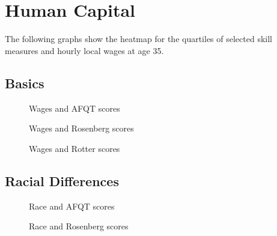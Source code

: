 \FloatBarrier\section{Human Capital}
The following graphs show the heatmap for the quartiles of selected skill measures and hourly local wages at age 35.

\FloatBarrier\subsection{Basics}
\begin{figure}[htp]\centering
\caption{Wages and AFQT scores}
\end{figure}

\begin{figure}[htp]\centering
\caption{Wages and Rosenberg scores}
\end{figure}

\begin{figure}[htp]\centering
\caption{Wages and Rotter scores}
\end{figure}
\FloatBarrier\subsection{Racial Differences}
\begin{figure}[htp]\centering
\caption{Race and AFQT scores}
\end{figure}

\begin{figure}[htp]\centering
\caption{Race and Rosenberg scores}
\end{figure}

